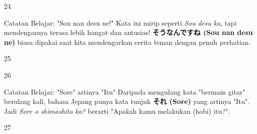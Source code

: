 \begin{convobox}{24}
    \noindent
      

    \vspace{1.5em}
\end{convobox}

\begin{lessonbox}{Catatan Belajar: "Sou nan desu ne!"}
    Kata ini mirip seperti \textit{Sou desu ka}, tapi mendengarnya terasa lebih hangat dan antusias! \textbf{そうなんですね (Sou nan desu ne)} biasa dipakai saat kita mendengarkan cerita teman dengan penuh perhatian.
\end{lessonbox}

\begin{convobox}{25}
    \noindent

    \vspace{1.5em}
\end{convobox}

\begin{convobox}{26}
    \noindent
      

    \vspace{1.5em}
\end{convobox}

\begin{lessonbox}{Catatan Belajar: "Sore" artinya "Itu"}
    Daripada mengulang kata "bermain gitar" berulang kali, bahasa Jepang punya kata tunjuk \textbf{それ (Sore)} yang artinya "Itu". Jadi \textit{Sore o shimashita ka?} berarti "Apakah kamu melakukan (hobi) itu?".
\end{lessonbox}

\begin{convobox}{27}
    \noindent
      
      

    \vspace{1.5em}
\end{convobox}

